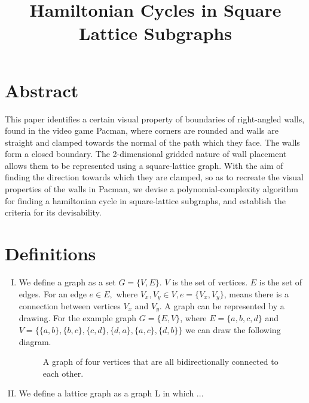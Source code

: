 \documentclass{article}
\title{Hamiltonian Cycles in Square Lattice Subgraphs}
\begin{document}
\date{\vspace{-5ex}}
\maketitle

\section{Abstract}
This paper identifies a certain visual property of boundaries of right-angled walls, found in the video game Pacman, where corners are rounded and walls are straight and clamped towards the normal of the path which they face. The walls form a closed boundary. The 2-dimensional gridded nature of wall placement allows them to be represented using a square-lattice graph. With the aim of finding the direction towards which they are clamped, so as to recreate the visual properties of the walls in Pacman, we devise a polynomial-complexity algorithm for finding a hamiltonian cycle in square-lattice subgraphs, and establish the criteria for its devisability.

\section{Definitions}
\begin{enumerate}[I.]
\item We define a graph as a set $G=\lbrace V,E \rbrace$. $V$ is the set of vertices. $E$ is the set of edges. For an edge $e\in E, $ where $ V_{x},V_{y}\in V, e=\lbrace V_{x},V_{y} \rbrace $, means there is a connection between vertices $V_{x}$ and $V_{y}$. A graph can be represented by a drawing. For the example graph $G=\lbrace E,V \rbrace$, where $E=\lbrace a,b,c,d \rbrace $ and $ V=\{\{a,b\},\{b,c\},\{c,d\},\{d,a\},\{a,c\},\{d,b\}\}$ we can draw the following diagram.
\begin{figure}[h]
\centering
{}
\caption{A graph of four vertices that are all bidirectionally connected to each other.}
\end{figure}
\item We define a lattice graph as a graph L in which ...
\end{enumerate}
\end{document}
